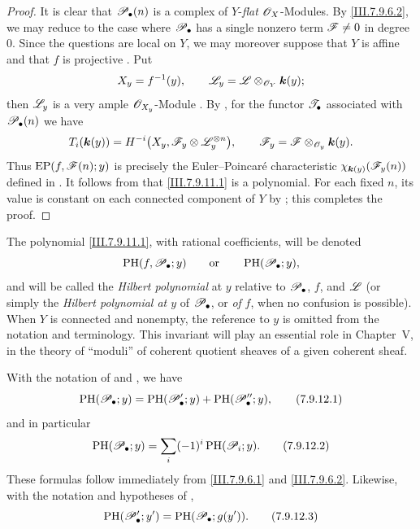 \begin{proof}
It is clear that $\mathscr{P}_\bullet(n)$ is a complex of
$Y$-\emph{flat} $\mathscr{O}_X$-Modules.  By
\eqref{III.7.9.6.2}, we may reduce to the case where
$\mathscr{P}_\bullet$ has a single nonzero term
$\mathscr{F}\neq0$ in degree $0$.  Since the questions are
local on $Y$, we may moreover suppose that $Y$ is affine
and that $f$ is projective .  Put
\[
  X_y=f^{-1}(y),\qquad
  \mathscr{L}_y=\mathscr{L}\otimes_{\mathscr{O}_Y}\boldsymbol{k}(y);
\]
then $\mathscr{L}_y$ is a very ample $\mathscr{O}_{X_y}$-Module
.  By , for the
functor $\mathscr{T}_\bullet$ associated with
$\mathscr{P}_\bullet(n)$ we have
\[
  T_i(\boldsymbol{k}(y))
  =
  H^{-i}\bigl(
    X_y,\mathscr{F}_y\otimes\mathscr{L}_y^{\otimes n}\bigr),
  \qquad
  \mathscr{F}_y=\mathscr{F}\otimes_{\mathscr{O}_y}\boldsymbol{k}(y).
\]
Thus $\operatorname{EP}(f,\mathscr{F}(n);y)$ is precisely the
Euler--Poincar\'e characteristic
$\chi_{\boldsymbol{k}(y)}(\mathscr{F}_y(n))$ defined in
.  It follows from  that
\eqref{III.7.9.11.1} is a polynomial.  For each fixed
$n$, its value is constant on each connected component of
$Y$ by ; this completes the proof.
\end{proof}

The polynomial \eqref{III.7.9.11.1}, with rational
coefficients, will be denoted
\[
  \operatorname{PH}(f,\mathscr{P}_\bullet;y)
  \qquad\text{or}\qquad
  \operatorname{PH}(\mathscr{P}_\bullet;y),
\]
and will be called the \emph{Hilbert polynomial} at $y$
relative to $\mathscr{P}_\bullet$, $f$, and $\mathscr{L}$ (or simply
the \emph{Hilbert polynomial at $y$} of
$\mathscr{P}_\bullet$, or \emph{of} $f$, when no confusion is
possible).  When $Y$ is connected and nonempty, the
reference to $y$ is omitted from the notation and
terminology.  This invariant will play an essential role
in Chapter~V, in the theory of ``moduli'' of coherent
quotient sheaves of a given coherent sheaf.

\begin{env}[7.9.12]
\label{III.7.9.12}
With the notation of  and
, we have
\[
  \operatorname{PH}(\mathscr{P}_\bullet;y)
  =
  \operatorname{PH}(\mathscr{P}'_\bullet;y)
  +
  \operatorname{PH}(\mathscr{P}''_\bullet;y),
  \tag{7.9.12.1}\label{III.7.9.12.1}
\]
and in particular
\[
  \operatorname{PH}(\mathscr{P}_\bullet;y)
  =
  \sum_i(- 1)^i\operatorname{PH}(\mathscr{P}_i;y).
  \tag{7.9.12.2}\label{III.7.9.12.2}
\]
These formulas follow immediately from
\eqref{III.7.9.6.1} and \eqref{III.7.9.6.2}.  Likewise,
with the notation and hypotheses of ,
\[
  \operatorname{PH}(\mathscr{P}'_\bullet;y')
  =
  \operatorname{PH}(\mathscr{P}_\bullet;g(y')).
  \tag{7.9.12.3}\label{III.7.9.12.3}
\]
\end{env}

